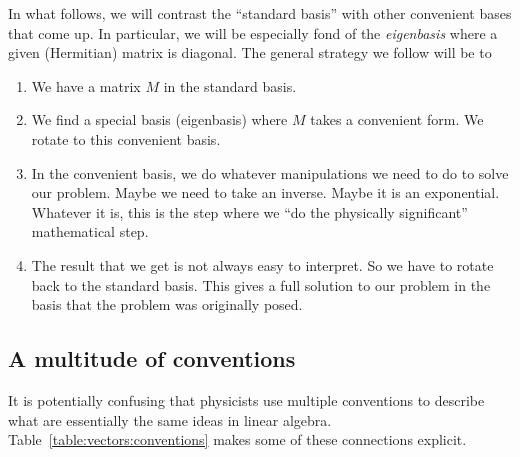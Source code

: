 \documentclass[12pt]{article}
\begin{document}
In what follows, we will contrast the ``standard basis'' with other convenient bases that come up. In particular, we will be especially fond of the \emph{eigenbasis} where a given (Hermitian) matrix is diagonal. The general strategy we follow will be to 
\begin{enumerate}
    \item We have a matrix $M$ in the standard basis. 
    \item We find a special basis (eigenbasis) where $M$ takes a convenient form. We rotate to this convenient basis.
    \item In the convenient basis, we do whatever manipulations we need to do to solve our problem. Maybe we need to take an inverse. Maybe it is an exponential. Whatever it is, this is the step where we ``do the physically significant'' mathematical step.
    \item The result that we get is not always easy to interpret. So we have to rotate back to the standard basis. This gives a full solution to our problem in the basis that the problem was originally posed.
\end{enumerate}






\subsection{A multitude of conventions}

It is potentially confusing that physicists use multiple conventions to describe what are essentially the same ideas in linear algebra. Table~\ref{table:vectors:conventions} makes some of these connections explicit.
\end{document}
